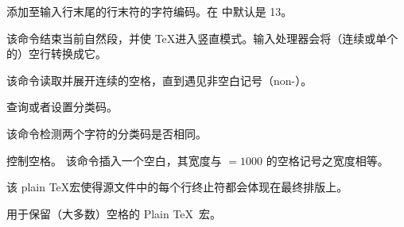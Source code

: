 \documentclass{book}
\begin{document}
\label{cschap:endlinechar}\label{cschap:ignorespaces}\label{cschap:catcode}
\label{cschap:char32}\label{cschap:obeylines}\label{cschap:obeyspaces}
\begin{inventory}
\item [\cs{endlinechar}]
      添加至输入行末尾的行末符的字符编码。在 \IniTeX 中默认是 13。
\item [\cs{par}]
      该命令结束当前自然段，并使 \TeX 进入竖直模式。输入处理器会将（连续或单个的）空行转换成它。

\item [\cs{ignorespaces}]
      该命令读取并展开连续的空格，直到遇见非空白记号（non-）。

\item [\cs{catcode}]
      查询或者设置分类码。

\item [\cs{ifcat}]
      该命令检测两个字符的分类码是否相同。

\item [\cs{\textvisiblespace}]
      控制空格。
      该命令插入一个空白，其宽度与 ${}=1000$ 的空格记号之宽度相等。

\item [\cs{obeylines}]
      该 plain \TeX 宏使得源文件中的每个行终止符都会体现在最终排版上。

\item [\cs{obeyspaces}]
      用于保留（大多数）空格的 Plain \TeX\ 宏。
\end{inventory}
\end{document}
